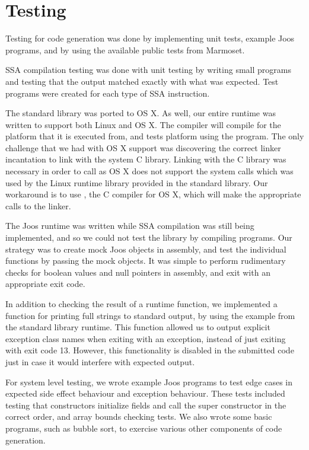 \documentclass[pdftex,10pt,a4paper]{article}
\begin{document}
\section{Testing}

Testing for code generation was done by implementing unit tests,
example Joos programs, and by using the available public tests from
Marmoset.

SSA compilation testing was done with unit testing by writing small
programs and testing that the output matched exactly with what was
expected. Test programs were created for each type of SSA
instruction.

The standard library  was ported to OS X. As well, our
entire runtime was written to support both  Linux and  OS
X. The compiler will compile for the platform that it is executed
from, and tests platform using the  program. The only
challenge that we had with OS X support was discovering the correct
linker incantation to link with the system C library. Linking with the
C library was necessary in order to call  as OS X does not
support the system calls which was used by the Linux runtime library
provided in the standard library. Our workaround is to use
, the C compiler for OS X, which will make the appropriate
calls to the linker.

The Joos runtime was written while SSA compilation was still being
implemented, and so we could not test the library by compiling
programs. Our strategy was to create mock Joos objects in assembly,
and test the individual functions by passing the mock objects. It was
simple to perform rudimentary checks for boolean values and null
pointers in assembly, and exit with an appropriate exit code.

In addition to checking the result of a runtime function, we
implemented a function for printing full strings to standard output,
by using the example from the standard library runtime. This function
allowed us to output explicit exception class names when exiting with
an exception, instead of just exiting with exit code 13. However, this
functionality is disabled in the submitted code just in case it would
interfere with expected output.

For system level testing, we wrote example Joos programs to test edge
cases in expected side effect behaviour and exception behaviour. These
tests included testing that constructors initialize fields and call the
super constructor in the correct order, and array bounds checking
tests. We also wrote some basic programs, such as bubble sort, to
exercise various other components of code generation.
\end{document}
